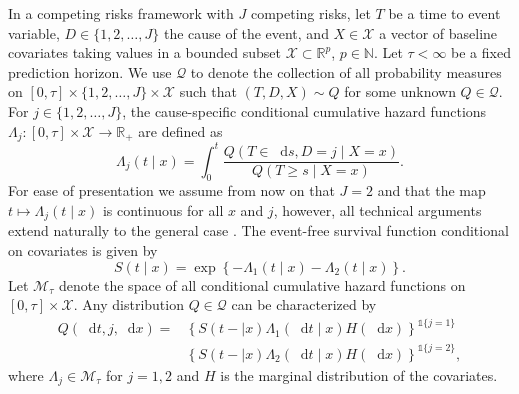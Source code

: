 \documentclass[alpha-refs]{wiley-article}
\newcommand{\R}{\mathbb{R}}
\newcommand{\N}{\mathbb{N}}
\newcommand*\diff{\mathop{}\!\mathrm{d}}
\newcommand{\1}{\mathds{1}}
\begin{document}
In a competing risks framework \citep{andersen2012statistical} with
\(J\) competing risks, let \( T\) be a time to event variable,
\(D\in\{1,2,\dots,J\}\) the cause of the event, and $X \in
\mathcal{X}$ a vector of baseline covariates taking values in a
bounded subset \( \mathcal{X} \subset \R^p \), \( p\in\N \). Let
$\tau< \infty$ be a fixed prediction horizon. We use \(\mathcal{Q} \)
to denote the collection of all probability measures on \( [0,\tau]
\times \{1,2,\dots,J\}\times \mathcal{X} \) such that \( (T, D, X) \sim Q \)
for some unknown \( Q \in \mathcal{Q} \). For \(j\in\{1,2,
\dots,J\}\), the cause-specific conditional cumulative hazard
functions \( \Lambda_{j} \colon [0, \tau] \times \mathcal{X}
\rightarrow \R_+ \) are defined as
\begin{equation*}
  \Lambda_{j}(t \mid x) = \int_0^t\frac{  Q(T \in \diff s, D=j \mid X=x )}{Q(T \geq s \mid X=x )}.
\end{equation*} For ease of presentation we assume from now on that
\(J=2\) and that the map \( t\mapsto \Lambda_j(t \mid x) \) is
continuous for all \( x \) and \( j \), however, all technical
arguments extend naturally to the general case
\citep{andersen2012statistical}.  The event-free survival function
conditional on covariates is given by
\begin{equation}
  \label{eq:surv-def}
  S(t \mid x)=\exp\left\{-\Lambda_{1}(t \mid x)-\Lambda_{2}(t \mid x)\right\}.
\end{equation}
Let \( \mathcal{M}_{\tau}\) denote the space of all conditional
cumulative hazard functions on \( [0,\tau] \times\mathcal{X}\). Any
distribution \( Q \in \mathcal{Q} \) can be characterized by
\begin{equation*}
  \label{eq:parametrizeQ}
  \begin{split}
    Q(\diff t,j,\diff x)=& \left\{S(t- \mid x)\Lambda_1(\diff t \mid x)H(\diff x)\right\}^{\1{\{j=1\}}}\\
                         &  \left\{S(t- \mid x)\Lambda_2(\diff t \mid x)H(\diff x)\right\}^{\1{\{j=2\}}},
  \end{split}
\end{equation*}
where \(\Lambda_{j} \in \mathcal{M}_{\tau}\) for \(j=1,2\) and \(H\) is the marginal
distribution of the covariates.
\end{document}

